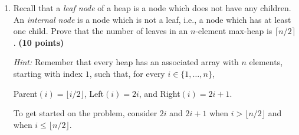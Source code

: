 \documentclass[11pt]{amsart}
\begin{document}
\begin{enumerate}
\bigskip

\item Recall that a \textit{leaf node} of a heap is a node which does not have any children. An \textit{internal node} is a node which is not a leaf, i.e., a node which has at least one child. Prove that the number of leaves in an $n$-element max-heap is $\lceil n / 2 \rceil$. \textbf{(10 points)}

\smallskip

\textit{Hint: } Remember that every heap has an associated array with $n$ elements, starting with index $1$, such that, for every $i \in \{1,\ldots,n\}$,
\begin{center}
Parent$(i) = \lfloor i / 2 \rfloor$, Left$(i) = 2i$, and Right$(i) = 2i+1$.
\end{center}
To get started on the problem, consider $2i$ and $2i+1$ when $i > \lfloor n / 2 \rfloor$ and when $i \leq \lfloor n / 2 \rfloor$.
\end{enumerate}
\end{document}
